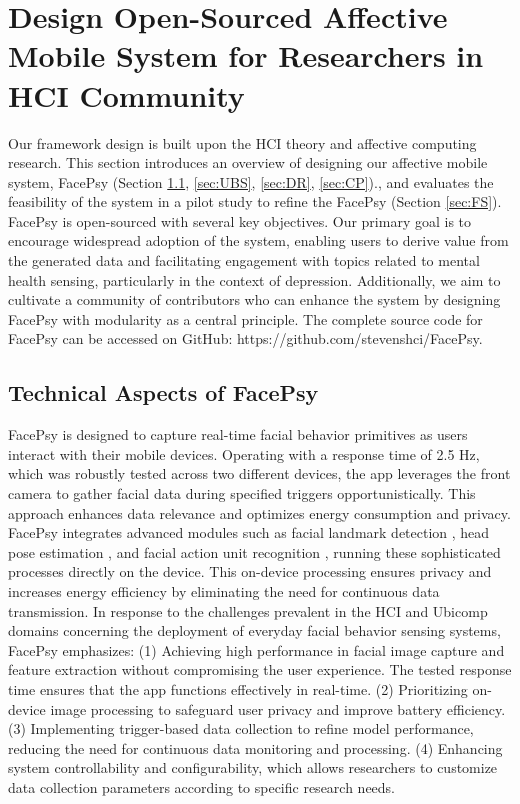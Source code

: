 \section{Design Open-Sourced Affective Mobile System for Researchers in HCI Community}
Our framework design is built upon the HCI theory and affective computing research. This section introduces an overview of designing our affective mobile system, FacePsy (Section \ref{sec:TAF}, \ref{sec:UBS}, \ref{sec:DR}, \ref{sec:CP})., and evaluates the feasibility of the system in a pilot study to refine the FacePsy (Section \ref{sec:FS}). FacePsy is open-sourced with several key objectives. Our primary goal is to encourage widespread adoption of the system, enabling users to derive value from the generated data and facilitating engagement with topics related to mental health sensing, particularly in the context of depression. Additionally, we aim to cultivate a community of contributors who can enhance the system by designing FacePsy with modularity as a central principle. The complete source code for FacePsy can be accessed on GitHub: https://github.com/stevenshci/FacePsy.

\subsection{Technical Aspects of FacePsy}
\label{sec:TAF}
FacePsy is designed to capture real-time facial behavior primitives as users interact with their mobile devices. Operating with a response time of 2.5 Hz, which was robustly tested across two different devices, the app leverages the front camera to gather facial data during specified triggers opportunistically. This approach enhances data relevance and optimizes energy consumption and privacy. FacePsy integrates advanced modules such as facial landmark detection \cite{mlkit}, head pose estimation \cite{mlkit}, and facial action unit recognition \cite{ertugrul2019cross}, running these sophisticated processes directly on the device. This on-device processing ensures privacy and increases energy efficiency by eliminating the need for continuous data transmission. In response to the challenges prevalent in the HCI and Ubicomp domains concerning the deployment of everyday facial behavior sensing systems, FacePsy emphasizes: (1) Achieving high performance in facial image capture and feature extraction without compromising the user experience. The tested response time ensures that the app functions effectively in real-time. (2) Prioritizing on-device image processing to safeguard user privacy and improve battery efficiency. (3) Implementing trigger-based data collection to refine model performance, reducing the need for continuous data monitoring and processing. (4) Enhancing system controllability and configurability, which allows researchers to customize data collection parameters according to specific research needs.

